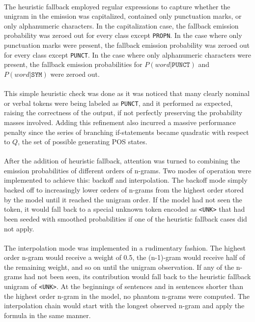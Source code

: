 \documentclass[11pt,a4paper]{article}
\begin{document}
\paragraph{}
The heuristic fallback employed regular expressions to capture whether the unigram
in the emission was capitalized, contained only punctuation marks, or only alphanumeric
characters. In the capitalization case, the fallback emission probability was zeroed out
for every class except \texttt{PROPN}. In the case where only punctuation marks were
present, the fallback emission probability was zeroed out for every class except
\texttt{PUNCT}. In the case where only alphanumeric characters were present, the fallback
emission probabilities for $P(word|\texttt{PUNCT})$ and $P(word|\texttt{SYM})$ were
zeroed out.

\paragraph{}
This simple heuristic check was done as it was noticed that many clearly nominal or
verbal tokens were being labeled as \texttt{PUNCT}, and it performed as expected,
raising the correctness of the output, if not perfectly preserving the probability masses
involved. Adding this refinement also incurred a massive performance penalty since
the series of branching if-statements became quadratic with respect to $Q$, the set
of possible generating POS states.

\paragraph{}
After the addition of heuristic fallback, attention was turned to combining the
emission probabilities of different orders of n-grams. Two modes of operation were
implemented to achieve this: backoff and interpolation. The backoff mode simply backed off
to increasingly lower orders of n-grams from the highest order stored by the model until
it reached the unigram order. If the model had not seen the token, it would fall back
to a special unknown token encoded as \texttt{<UNK>} that had been seeded with smoothed
probabilities if one of the heuristic fallback cases did not apply.

\paragraph{}
The interpolation mode was implemented in a rudimentary fashion. The highest order n-gram
would receive a weight of 0.5, the (n-1)-gram would receive half of the remaining weight, and so on until the unigram observation. If any of the n-grams had not been seen, its
contribution would fall back to the heuristic fallback unigram of \texttt{<UNK>}.
At the beginnings of sentences and in sentences shorter than the highest order n-gram
in the model, no phantom n-grams were computed. The interpolation chain would start with
the longest observed n-gram and apply the formula in the same manner.
\end{document}
